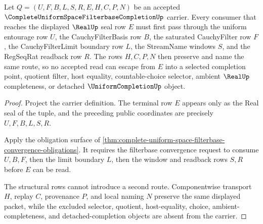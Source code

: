 \begin{theorem}
\label{thm:complete-uniform-space-filterbase-real-seal-nonescape}
Let $Q=(U,F,B,L,S,R,E,H,C,P,N)$ be an accepted $\CompleteUniformSpaceFilterbaseCompletionUp$ carrier. Every consumer that reaches the displayed $\RealUp$ seal row $E$ must first pass through the uniform entourage row $U$, the CauchyFilterBasis row $B$, the saturated CauchyFilter row $F$, the CauchyFilterLimit boundary row $L$, the StreamName windows $S$, and the RegSeqRat readback row $R$. The rows $H,C,P,N$ then preserve and name the same route, so no accepted read can escape from $E$ into a selected completion point, quotient filter, host equality, countable-choice selector, ambient $\RealUp$ completeness, or detached $\UniformCompletionUp$ object.
\end{theorem}
\begin{proof}
Project the carrier definition. The terminal row $E$ appears only as the Real seal of the tuple, and the preceding public coordinates are precisely $U,F,B,L,S,R$.

Apply the obligation surface of \autoref{thm:complete-uniform-space-filterbase-convergence-obligations}. It requires the filterbase convergence request to consume $U,B,F$, then the limit boundary $L$, then the window and readback rows $S,R$ before $E$ can be read.

The structural rows cannot introduce a second route. Componentwise transport $H$, replay $C$, provenance $P$, and local naming $N$ preserve the same displayed packet, while the excluded selector, quotient, host-equality, choice, ambient-completeness, and detached-completion objects are absent from the carrier.
\end{proof}

